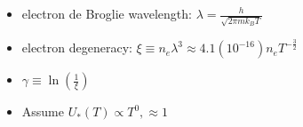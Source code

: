 
\begin{itemize}
	\item electron de Broglie wavelength: $\lambda = \frac{h}{\sqrt{2\pi mk_BT}}$
	\item electron degeneracy: $\xi \equiv n_e\lambda^3 \approx 4.1(10^{-16})n_eT^{-\frac{3}{2}}$
	\item $\gamma \equiv \ln(\frac{1}{\xi})$
	\item Assume $U_*(T) \propto T^0, \approx 1$
\end{itemize}

\begin{enumerate}
\qitem{}
\work{}
\ans{}

\qitem{}
\work{}
\ans{}

\qitem{}
\work{}
\ans{}
\end{enumerate}